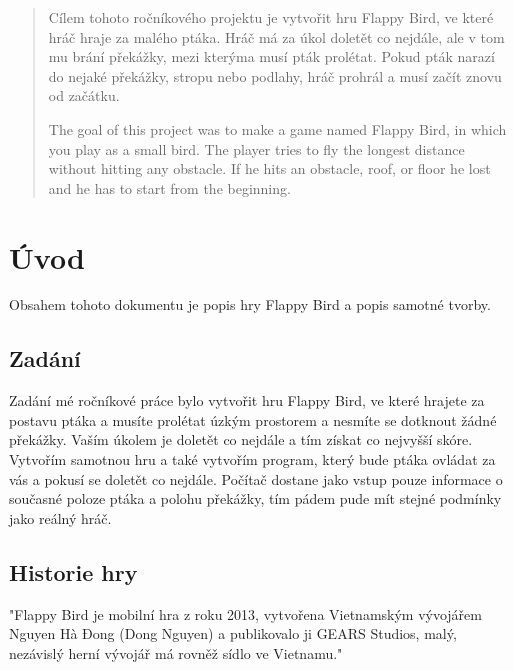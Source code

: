 \begin{abstract}
    Cílem tohoto ročníkového projektu je vytvořit hru Flappy Bird, ve které hráč hraje za malého ptáka. Hráč má za úkol doletět co nejdále, ale v tom mu brání překážky, mezi kterýma musí pták prolétat. Pokud pták narazí do nejaké překážky, stropu nebo podlahy, hráč prohrál a musí začít znovu od začátku.
    
    \hspace{}
    
    \hspace{}
    
    The goal of this project was to make a game named Flappy Bird, in which you play as a small bird. The player tries to fly the longest distance without hitting any obstacle. If he hits an obstacle, roof, or floor he lost and he has to start from the beginning.
    
\end{abstract}

\section{Úvod}

Obsahem tohoto dokumentu je popis hry Flappy Bird a popis samotné tvorby.

\subsection{Zadání}

Zadání mé ročníkové práce bylo vytvořit hru Flappy Bird, ve které hrajete za postavu ptáka a musíte prolétat úzkým prostorem a nesmíte se dotknout žádné překážky. Vaším úkolem je doletět co nejdále a tím získat co nejvyšší skóre. 
Vytvořím samotnou hru a také vytvořím program, který bude ptáka ovládat za vás a pokusí se doletět co nejdále. Počítač dostane jako vstup pouze informace o současné poloze ptáka a polohu překážky, tím pádem pude mít stejné podmínky jako reálný hráč.

\subsection{Historie hry}
"Flappy Bird je mobilní hra z roku 2013, vytvořena Vietnamským vývojářem Nguyen Hà Đong (Dong Nguyen) a publikovalo ji GEARS Studios, malý, nezávislý herní vývojář má rovněž sídlo ve Vietnamu."\cite{historie}
